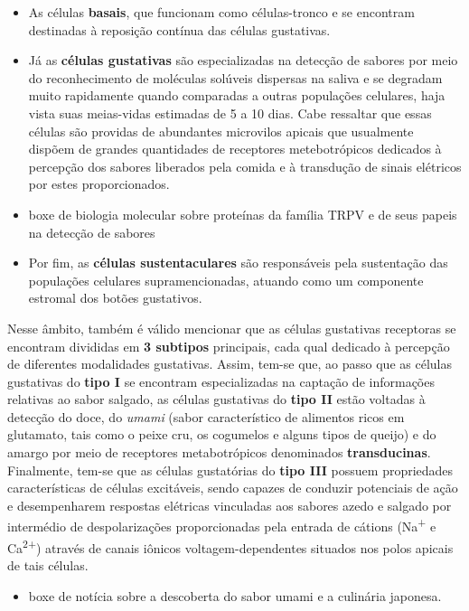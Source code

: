 \documentclass[
]{book}
\providecommand{\tightlist}{%
  \setlength{\itemsep}{0pt}\setlength{\parskip}{0pt}}
\theoremstyle{definition}
\theoremstyle{definition}
\theoremstyle{definition}
\theoremstyle{definition}
\theoremstyle{remark}
\begin{document}
\begin{itemize}
\item
  As células \textbf{basais}, que funcionam como células-tronco e se encontram destinadas à reposição contínua das células gustativas.
\item
  Já as \textbf{células gustativas} são especializadas na detecção de sabores por meio do reconhecimento de moléculas solúveis dispersas na saliva e se degradam muito rapidamente quando comparadas a outras populações celulares, haja vista suas meias-vidas estimadas de 5 a 10 dias. Cabe ressaltar que essas células são providas de abundantes microvilos apicais que usualmente dispõem de grandes quantidades de receptores metebotrópicos dedicados à percepção dos sabores liberados pela comida e à transdução de sinais elétricos por estes proporcionados.
\item
  boxe de biologia molecular sobre proteínas da família TRPV e de seus papeis na detecção de sabores
\item
  Por fim, as \textbf{células sustentaculares} são responsáveis pela sustentação das populações celulares supramencionadas, atuando como um componente estromal dos botões gustativos.
\end{itemize}

Nesse âmbito, também é válido mencionar que as células gustativas receptoras se encontram divididas em \textbf{3 subtipos} principais, cada qual dedicado à percepção de diferentes modalidades gustativas. Assim, tem-se que, ao passo que as células gustativas do \textbf{tipo I} se encontram especializadas na captação de informações relativas ao sabor salgado, as células gustativas do \textbf{tipo II} estão voltadas à detecção do doce, do \emph{umami} (sabor característico de alimentos ricos em glutamato, tais como o peixe cru, os cogumelos e alguns tipos de queijo) e do amargo por meio de receptores metabotrópicos denominados \textbf{transducinas}. Finalmente, tem-se que as células gustatórias do \textbf{tipo III} possuem propriedades características de células excitáveis, sendo capazes de conduzir potenciais de ação e desempenharem respostas elétricas vinculadas aos sabores azedo e salgado por intermédio de despolarizações proporcionadas pela entrada de cátions (Na\textsuperscript{+} e Ca\textsuperscript{2+}) através de canais iônicos voltagem-dependentes situados nos polos apicais de tais células.

\begin{itemize}
\tightlist
\item
  boxe de notícia sobre a descoberta do sabor umami e a culinária japonesa.
\end{itemize}
\end{document}
